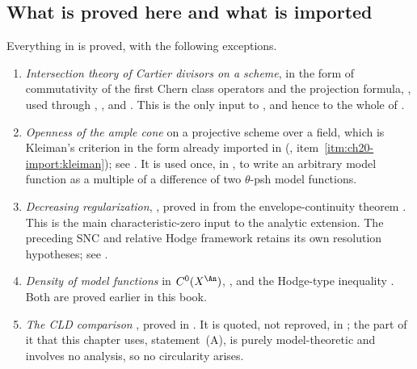 \subsection{What is proved here and what is imported}
\label{sec:ch24-imported}

Everything in
 is proved, with the
following exceptions.

\begin{enumerate}
\item\label{itm:ch24-import:intersection}
 \emph{Intersection theory of Cartier divisors on a scheme}, in the form of
 commutativity of the first Chern class operators and the projection
 formula, \cite[Chapters~1--2]{Ful}, used through
 , ,
  and
 .  This is the only input to
 , and hence to the whole of
 .
\item\label{itm:ch24-import:kleiman}
 \emph{Openness of the ample cone} on a projective scheme over a field,
 which is Kleiman's criterion in the form already imported in
 (, item~\cref{itm:ch20-import:kleiman}); see
 \cite[\S1.4]{PAG1}.  It is used once, in ,
 to write an arbitrary model function as a multiple of a difference of two
 $\theta$-psh model functions.
\item\label{itm:ch24-import:regularization}
 \emph{Decreasing regularization}, ,
 proved in  from the envelope-continuity theorem
 .  This is the main characteristic-zero
 input to the analytic extension.  The preceding SNC and relative Hodge
 framework retains its own resolution hypotheses; see
 .
\item\label{itm:ch24-import:density}
 \emph{Density of model functions} in $C^0(X^{\An})$,
 , and the Hodge-type inequality
 .  Both are proved earlier in this book.
\item\label{itm:ch24-import:cld}
 \emph{The CLD comparison} , proved in
 .  It is quoted, not reproved, in
 ; the part of it that this chapter uses,
 statement~(A), is purely model-theoretic and involves no analysis, so no
 circularity arises.
\end{enumerate}

